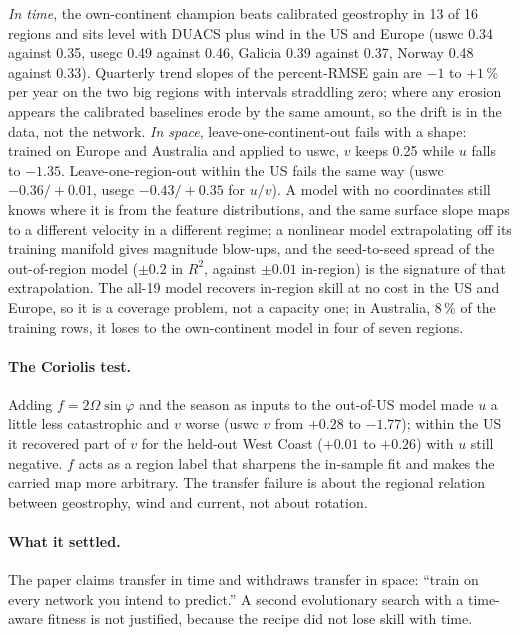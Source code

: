 \documentclass[11pt]{article}
\newcommand{\R}{R^2}
\begin{document}
\emph{In time}, the own-continent champion beats calibrated geostrophy in 13 of 16 regions and sits level with DUACS plus wind in the US and Europe (uswc 0.34 against 0.35, usegc 0.49 against 0.46, Galicia 0.39 against 0.37, Norway 0.48 against 0.33). Quarterly trend slopes of the percent-RMSE gain are $-1$ to $+1$\,\% per year on the two big regions with intervals straddling zero; where any erosion appears the calibrated baselines erode by the same amount, so the drift is in the data, not the network. \emph{In space}, leave-one-continent-out fails with a shape: trained on Europe and Australia and applied to uswc, $v$ keeps 0.25 while $u$ falls to $-1.35$. Leave-one-region-out within the US fails the same way (uswc $-0.36/+0.01$, usegc $-0.43/+0.35$ for $u/v$). A model with no coordinates still knows where it is from the feature distributions, and the same surface slope maps to a different velocity in a different regime; a nonlinear model extrapolating off its training manifold gives magnitude blow-ups, and the seed-to-seed spread of the out-of-region model ($\pm0.2$ in $\R$, against $\pm0.01$ in-region) is the signature of that extrapolation. The all-19 model recovers in-region skill at no cost in the US and Europe, so it is a coverage problem, not a capacity one; in Australia, 8\,\% of the training rows, it loses to the own-continent model in four of seven regions.

\paragraph{The Coriolis test.} Adding $f = 2\Omega\sin\varphi$ and the season as inputs to the out-of-US model made $u$ a little less catastrophic and $v$ worse (uswc $v$ from $+0.28$ to $-1.77$); within the US it recovered part of $v$ for the held-out West Coast ($+0.01$ to $+0.26$) with $u$ still negative. $f$ acts as a region label that sharpens the in-sample fit and makes the carried map more arbitrary. The transfer failure is about the regional relation between geostrophy, wind and current, not about rotation.

\paragraph{What it settled.} The paper claims transfer in time and withdraws transfer in space: ``train on every network you intend to predict.'' A second evolutionary search with a time-aware fitness is not justified, because the recipe did not lose skill with time.
\end{document}
